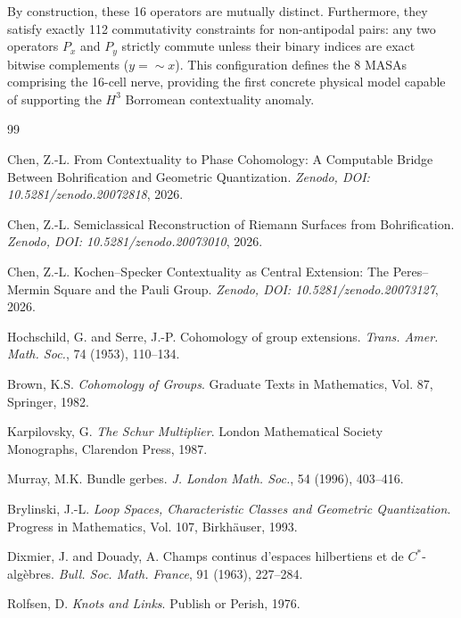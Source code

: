 \documentclass[11pt]{article}
\begin{document}
By construction, these 16 operators are mutually distinct. Furthermore, they satisfy exactly 112 commutativity constraints for non-antipodal pairs: any two operators $P_x$ and $P_y$ strictly commute unless their binary indices are exact bitwise complements ($y = \sim x$). This configuration defines the 8 MASAs comprising the 16-cell nerve, providing the first concrete physical model capable of supporting the $H^3$ Borromean contextuality anomaly.


\begin{thebibliography}{99}

Chen, Z.-L.
From Contextuality to Phase Cohomology:
A Computable Bridge Between Bohrification and Geometric Quantization.
\textit{Zenodo, DOI: 10.5281/zenodo.20072818}, 2026.

Chen, Z.-L.
Semiclassical Reconstruction of Riemann Surfaces from Bohrification.
\textit{Zenodo, DOI: 10.5281/zenodo.20073010}, 2026.

Chen, Z.-L.
Kochen--Specker Contextuality as Central Extension: The Peres--Mermin Square and the Pauli Group.
\textit{Zenodo, DOI: 10.5281/zenodo.20073127}, 2026.

Hochschild, G. and Serre, J.-P.
Cohomology of group extensions.
\textit{Trans. Amer. Math. Soc.}, 74 (1953), 110--134.

Brown, K.S.
\textit{Cohomology of Groups}.
Graduate Texts in Mathematics, Vol. 87, Springer, 1982.

Karpilovsky, G.
\textit{The Schur Multiplier}.
London Mathematical Society Monographs, Clarendon Press, 1987.

Murray, M.K.
Bundle gerbes.
\textit{J. London Math. Soc.}, 54 (1996), 403--416.

Brylinski, J.-L.
\textit{Loop Spaces, Characteristic Classes and Geometric Quantization}.
Progress in Mathematics, Vol. 107, Birkhäuser, 1993.

Dixmier, J. and Douady, A.
Champs continus d'espaces hilbertiens et de $C^*$-algèbres.
\textit{Bull. Soc. Math. France}, 91 (1963), 227--284.

Rolfsen, D.
\textit{Knots and Links}.
Publish or Perish, 1976.


\end{thebibliography}
\end{document}
